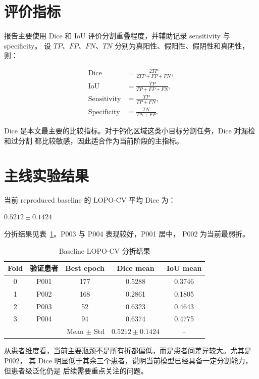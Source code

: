 \documentclass[UTF8,11pt]{ctexart}
\begin{document}
\section{评价指标}

报告主要使用 Dice 和 IoU 评价分割重叠程度，并辅助记录 sensitivity 与 specificity。
设 $TP$、$FP$、$FN$、$TN$ 分别为真阳性、假阳性、假阴性和真阴性，则：

\begin{align}
\mathrm{Dice} &= \frac{2TP}{2TP + FP + FN}, \\
\mathrm{IoU} &= \frac{TP}{TP + FP + FN}, \\
\mathrm{Sensitivity} &= \frac{TP}{TP + FN}, \\
\mathrm{Specificity} &= \frac{TN}{TN + FP}.
\end{align}

Dice 是本文最主要的比较指标。对于钙化区域这类小目标分割任务，Dice 对漏检和过分割
都比较敏感，因此适合作为当前阶段的主指标。

\section{主线实验结果}

当前 reproduced baseline 的 LOPO-CV 平均 Dice 为：

\begin{center}
\Large
$0.5212 \pm 0.1424$
\end{center}

分折结果见表~\ref{tab:fold-results}。P003 与 P004 表现较好，P001 居中，
P002 为当前最弱折。

\begin{table}[htbp]
\centering
\caption{Baseline LOPO-CV 分折结果}
\label{tab:fold-results}
\begin{tabular}{ccccc}
\toprule
Fold & 验证患者 & Best epoch & Dice mean & IoU mean \\
\midrule
0 & P001 & 177 & 0.5288 & 0.3746 \\
1 & P002 & 168 & 0.2861 & 0.1805 \\
2 & P003 & 52  & 0.6323 & 0.4643 \\
3 & P004 & 94  & 0.6374 & 0.4775 \\
\midrule
\multicolumn{3}{r}{Mean $\pm$ Std} & $0.5212 \pm 0.1424$ & -- \\
\bottomrule
\end{tabular}
\end{table}

从患者维度看，当前主要瓶颈不是所有折都偏低，而是患者间差异较大。尤其是 P002，
其 Dice 明显低于其余三个患者，说明当前模型已经具备一定分割能力，但患者级泛化仍是
后续需要重点关注的问题。
\end{document}

